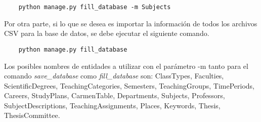 \begin{verbatim}
    python manage.py fill_database -m Subjects
\end{verbatim}

Por otra parte, si lo que se desea es importar la información de todos los archivos CSV  
para la base de datos, se debe ejecutar el siguiente comando.

\begin{verbatim}
    python manage.py fill_database
\end{verbatim}


Los posibles nombres de entidades a utilizar con
el parámetro -m tanto para el comando 
\textit{save\_database} como \textit{fill\_database} son:
ClassTypes, Faculties,
ScientificDegrees, TeachingCategories,
Semesters, TeachingGroups, TimePeriods,
Careers, StudyPlans, CarmenTable, Departments,
Subjects, Professors, SubjectDescriptions, TeachingAssignments,
Places, Keywords, Thesis, ThesisCommittee.




